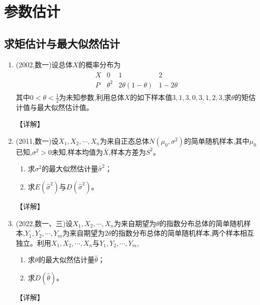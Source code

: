 \documentclass[12pt, a4paper, oneside, UTF8]{ctexbook}
\begin{document}
\section{参数估计}

\subsection{求矩估计与最大似然估计}

\begin{enumerate}[label=\arabic*.]
    \item (2002,数一)设总体$X$的概率分布为
    \begin{align*}
        \begin{array}{c|ccc}
        X & 0 & 1 & 2 \\
        \hline
        P & \theta^2 & 2\theta(1-\theta) & 1-2\theta
        \end{array}
    \end{align*}
    其中$0<\theta<\frac{1}{2}$为未知参数,利用总体$X$的如下样本值$3,1,3,0,3,1,2,3$,求$\theta$的矩估计值与最大似然估计值。
    
    \begin{solution}
    【详解】
    \end{solution}
    
    \item (2011,数一)设$X_1,X_2,\cdots,X_n$为来自正态总体$N(\mu_0,\sigma^2)$的简单随机样本,其中$\mu_0$已知,$\sigma^2>0$未知,样本均值为$\bar{X}$,样本方差为$S^2$。
    \begin{enumerate}
        \item 求$\sigma^2$的最大似然估计量$\hat{\sigma}^2$；
        \item 求$E(\hat{\sigma}^2)$与$D(\hat{\sigma}^2)$。
    \end{enumerate}
    
    \begin{solution}
    【详解】
    \end{solution}
    
    \item (2022,数一、三)设$X_1,X_2,\cdots,X_n$为来自期望为$\theta$的指数分布总体的简单随机样本,$Y_1,Y_2,\cdots,Y_m$为来自期望为$2\theta$的指数分布总体的简单随机样本,两个样本相互独立。利用$X_1,X_2,\cdots,X_n$与$Y_1,Y_2,\cdots,Y_m$,
    \begin{enumerate}
        \item 求$\theta$的最大似然估计量$\hat{\theta}$；
        \item 求$D(\hat{\theta})$。
    \end{enumerate}
    
    \begin{solution}
    【详解】
    \end{solution}
\end{enumerate}
\end{document}
